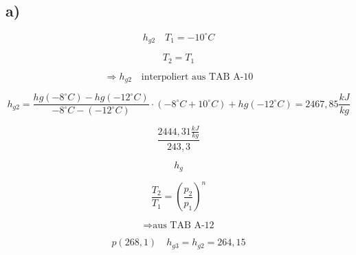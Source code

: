 \subsection*{a)}

\[
h_{g2} \quad T_1 = -10^\circ C
\]

\[
T_2 = T_1
\]

\[
\Rightarrow h_{g2} \quad \text{interpoliert aus TAB A-10}
\]

\[
h_{g2} = \frac{hg(-8^\circ C) - hg(-12^\circ C)}{-8^\circ C - (-12^\circ C)} \cdot (-8^\circ C + 10^\circ C) + hg(-12^\circ C) = 2467,85 \frac{kJ}{kg}
\]

\[
\frac{2444,31 \frac{kJ}{kg}}{243,3}
\]

\[
h_{g}
\]

\[
\frac{T_2}{T_1} = \left( \frac{p_2}{p_1} \right)^n
\]

\[
\Rightarrow \text{aus TAB A-12}
\]

\[
p(268,1) \quad h_{g3} = h_{g2} = 264,15
\]